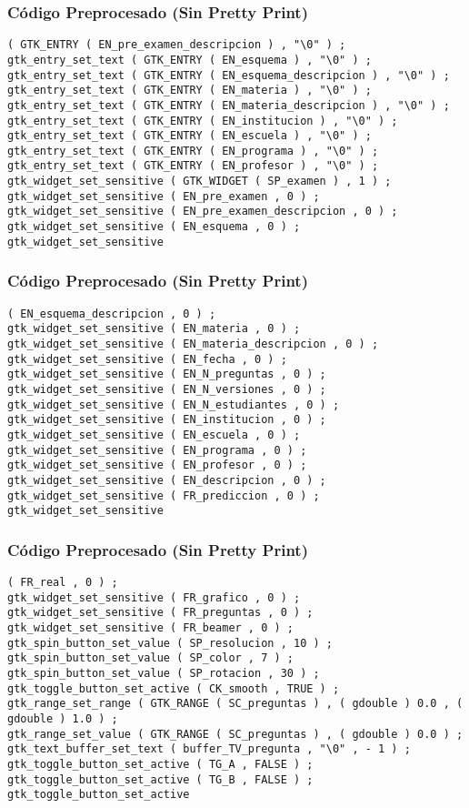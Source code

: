 \documentclass{beamer}
\begin{document}
\begin{frame}[fragile]
\frametitle{C\'odigo Preprocesado (Sin Pretty Print)}
\begin{lstlisting}[style=CStyle]
( GTK_ENTRY ( EN_pre_examen_descripcion ) , "\0" ) ; 
gtk_entry_set_text ( GTK_ENTRY ( EN_esquema ) , "\0" ) ; 
gtk_entry_set_text ( GTK_ENTRY ( EN_esquema_descripcion ) , "\0" ) ; 
gtk_entry_set_text ( GTK_ENTRY ( EN_materia ) , "\0" ) ; 
gtk_entry_set_text ( GTK_ENTRY ( EN_materia_descripcion ) , "\0" ) ; 
gtk_entry_set_text ( GTK_ENTRY ( EN_institucion ) , "\0" ) ; 
gtk_entry_set_text ( GTK_ENTRY ( EN_escuela ) , "\0" ) ; 
gtk_entry_set_text ( GTK_ENTRY ( EN_programa ) , "\0" ) ; 
gtk_entry_set_text ( GTK_ENTRY ( EN_profesor ) , "\0" ) ; 
gtk_widget_set_sensitive ( GTK_WIDGET ( SP_examen ) , 1 ) ; 
gtk_widget_set_sensitive ( EN_pre_examen , 0 ) ; 
gtk_widget_set_sensitive ( EN_pre_examen_descripcion , 0 ) ; 
gtk_widget_set_sensitive ( EN_esquema , 0 ) ; 
gtk_widget_set_sensitive \end{lstlisting}
\end{frame}
\begin{frame}[fragile]
\frametitle{C\'odigo Preprocesado (Sin Pretty Print)}
\begin{lstlisting}[style=CStyle]
( EN_esquema_descripcion , 0 ) ; 
gtk_widget_set_sensitive ( EN_materia , 0 ) ; 
gtk_widget_set_sensitive ( EN_materia_descripcion , 0 ) ; 
gtk_widget_set_sensitive ( EN_fecha , 0 ) ; 
gtk_widget_set_sensitive ( EN_N_preguntas , 0 ) ; 
gtk_widget_set_sensitive ( EN_N_versiones , 0 ) ; 
gtk_widget_set_sensitive ( EN_N_estudiantes , 0 ) ; 
gtk_widget_set_sensitive ( EN_institucion , 0 ) ; 
gtk_widget_set_sensitive ( EN_escuela , 0 ) ; 
gtk_widget_set_sensitive ( EN_programa , 0 ) ; 
gtk_widget_set_sensitive ( EN_profesor , 0 ) ; 
gtk_widget_set_sensitive ( EN_descripcion , 0 ) ; 
gtk_widget_set_sensitive ( FR_prediccion , 0 ) ; 
gtk_widget_set_sensitive \end{lstlisting}
\end{frame}
\begin{frame}[fragile]
\frametitle{C\'odigo Preprocesado (Sin Pretty Print)}
\begin{lstlisting}[style=CStyle]
( FR_real , 0 ) ; 
gtk_widget_set_sensitive ( FR_grafico , 0 ) ; 
gtk_widget_set_sensitive ( FR_preguntas , 0 ) ; 
gtk_widget_set_sensitive ( FR_beamer , 0 ) ; 
gtk_spin_button_set_value ( SP_resolucion , 10 ) ; 
gtk_spin_button_set_value ( SP_color , 7 ) ; 
gtk_spin_button_set_value ( SP_rotacion , 30 ) ; 
gtk_toggle_button_set_active ( CK_smooth , TRUE ) ; 
gtk_range_set_range ( GTK_RANGE ( SC_preguntas ) , ( gdouble ) 0.0 , ( gdouble ) 1.0 ) ; 
gtk_range_set_value ( GTK_RANGE ( SC_preguntas ) , ( gdouble ) 0.0 ) ; 
gtk_text_buffer_set_text ( buffer_TV_pregunta , "\0" , - 1 ) ; 
gtk_toggle_button_set_active ( TG_A , FALSE ) ; 
gtk_toggle_button_set_active ( TG_B , FALSE ) ; 
gtk_toggle_button_set_active \end{lstlisting}
\end{frame}
\end{document}
